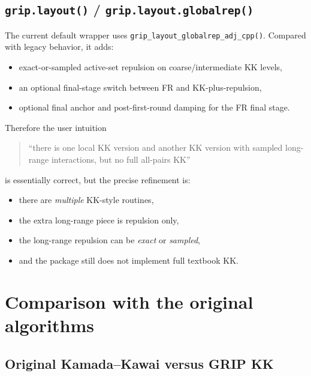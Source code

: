 \documentclass[11pt]{article}
\begin{document}
\subsection{\texttt{grip.layout()} / \texttt{grip.layout.globalrep()}}

The current default wrapper uses \texttt{grip\_layout\_globalrep\_adj\_cpp()}.
Compared with legacy behavior, it adds:
\begin{itemize}[leftmargin=1.5em]
\item exact-or-sampled active-set repulsion on coarse/intermediate KK levels,
\item an optional final-stage switch between FR and KK-plus-repulsion,
\item optional final anchor and post-first-round damping for the FR final stage.
\end{itemize}

Therefore the user intuition
\begin{quote}
``there is one local KK version and another KK version with sampled long-range
interactions, but no full all-pairs KK''
\end{quote}
is essentially correct, but the precise refinement is:
\begin{itemize}[leftmargin=1.5em]
\item there are \emph{multiple} KK-style routines,
\item the extra long-range piece is repulsion only,
\item the long-range repulsion can be \emph{exact} or \emph{sampled},
\item and the package still does not implement full textbook KK.
\end{itemize}

\section{Comparison with the original algorithms}

\subsection{Original Kamada--Kawai versus GRIP KK}
\end{document}
